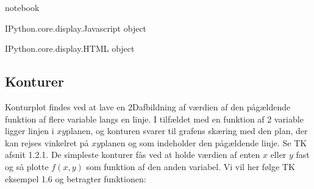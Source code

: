 \documentclass[letterpaper,10pt,english]{jupyterBook}
\begin{document}
\begin{sphinxVerbatim}[commandchars=\\\{\}]
                
 notebook                          

                                   
            
         
              
\end{sphinxVerbatim}

\begin{sphinxVerbatim}[commandchars=\\\{\}]
\PYGZlt{}IPython.core.display.Javascript object\PYGZgt{}
\end{sphinxVerbatim}

\begin{sphinxVerbatim}[commandchars=\\\{\}]
\PYGZlt{}IPython.core.display.HTML object\PYGZgt{}
\end{sphinxVerbatim}


\subsection{Konturer}
\label{\detokenize{notebooks/sympy/Notebook_FlereVar_plot:konturer}}
Konturplot findes ved at lave en 2D\sphinxhyphen{}afbildning af værdien af den pågældende funktion af flere variable langs en linje. I tilfældet med en funktion af 2 variable ligger linjen i \(xy\)\sphinxhyphen{}planen, og konturen svarer til grafens skæring med den plan, der kan rejses vinkelret på \(xy\)\sphinxhyphen{}planen og som indeholder den pågældende linje. Se TK afsnit 1.2.1. De simpleste konturer fås ved at holde værdien af enten \(x\) eller \(y\) fast og så plotte \(f(x,y)\) som funktion af den anden variabel. Vi vil her følge TK eksempel 1.6 og betragter funktionen:
\end{document}
